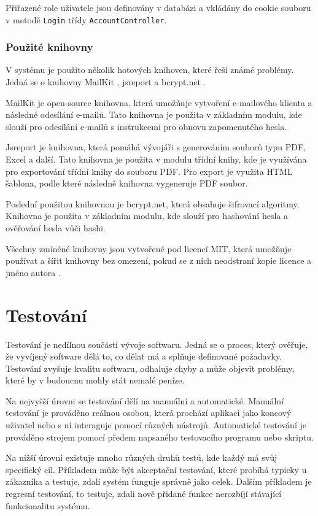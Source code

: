 Přiřazené role uživatele jsou definovány v databázi a vkládány do cookie souboru v metodě \texttt{Login} třídy \texttt{AccountController}.

\subsubsection{Použité knihovny}
V systému je použito několik hotových knihoven, které řeší známé problémy. Jedná se o knihovny MailKit \cite{mailkit}, jsreport \cite{jsreport} a bcrypt.net \cite{bcrypt}.

MailKit je open-source knihovna, která umožňuje vytvoření e-mailového klienta a následné odesílání e-mailů. Tato knihovna je použita v základním modulu, kde slouží pro odesílání e-mailů s instrukcemi pro obnovu zapomenutého hesla.

Jsreport je knihovna, která pomáhá vývojáři s generováním souborů typu PDF, Excel a další. Tato knihovna je použita v modulu třídní knihy, kde je využívána pro exportování třídní knihy do souboru PDF. Pro export je využita HTML šablona, podle které následně knihovna vygeneruje PDF soubor.

Poslední použitou knihovnou je bcrypt.net, která obsahuje šifrovací algoritmy. Knihovna je použita v základním modulu, kde slouží pro hashování hesla a ověřování hesla vůči hashi.

Všechny zmíněné knihovny jsou vytvořené pod licencí MIT, která umožňuje používat a šířit knihovny bez omezení, pokud se z nich neodstraní kopie licence a jméno autora \cite{licence}.


\section{Testování}
Testování je nedílnou součástí vývoje softwaru. Jedná se o proces, který ověřuje, že vyvíjený software dělá to, co dělat má a splňuje definované požadavky. Testování zvyšuje kvalitu softwaru, odhaluje chyby a může objevit problémy, které by v budoucnu mohly stát nemalé peníze. \cite{what-is-sw-testing}

Na nejvyšší úrovni se testování dělí na manuální a automatické. Manuální testování je prováděno reálnou osobou, která prochází aplikaci jako koncový uživatel nebo s ní interaguje pomocí různých nástrojů. Automatické testování je prováděno strojem pomocí předem napsaného testovacího programu nebo skriptu. \cite{sw-testing-types}

Na nižší úrovni existuje mnoho různých druhů testů, kde každý má svůj specifický cíl. Příkladem může být akceptační testování, které probíhá typicky u zákazníka a testuje, zdali systém funguje správně jako celek. Dalším příkladem je regresní testování, to testuje, zdali nově přidané funkce nerozbíjí stávající funkcionalitu systému. \cite{what-is-sw-testing}

